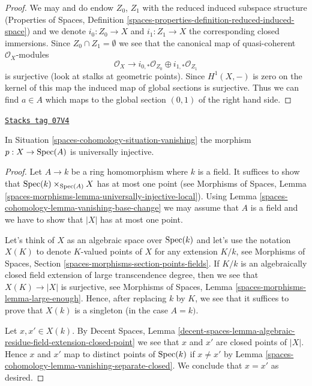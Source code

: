 \begin{proof}
We may and do endow $Z_0$, $Z_1$ with the reduced induced subspace structure
(Properties of Spaces, Definition
\ref{spaces-properties-definition-reduced-induced-space}) and we denote
$i_0 : Z_0 \to X$ and $i_1 : Z_1 \to X$ the corresponding closed immersions.
Since $Z_0 \cap Z_1 = \emptyset$ we see that the canonical map of
quasi-coherent $\mathcal{O}_X$-modules
$$
\mathcal{O}_X
\longrightarrow
i_{0, *}\mathcal{O}_{Z_0} \oplus i_{1, *}\mathcal{O}_{Z_1}
$$
is surjective (look at stalks at geometric points). Since $H^1(X, -)$ is
zero on the kernel of this map the induced map of global sections is
surjective. Thus we can find $a \in A$ which maps to the global section
$(0, 1)$ of the right hand side.
\end{proof}

\begin{lemma}
\label{spaces-cohomology-lemma-vanishing-injective}
\href{https://stacks.math.columbia.edu/tag/07V4}{\texttt{Stacks tag 07V4}}

In Situation \ref{spaces-cohomology-situation-vanishing} the morphism $p : X \to \operatorname{Spec}(A)$ is
universally injective.
\end{lemma}

\begin{proof}
Let $A \to k$ be a ring homomorphism where $k$ is a field. It suffices to
show that $\operatorname{Spec}(k) \times_{\operatorname{Spec}(A)} X$ has at most one point (see
Morphisms of Spaces, Lemma
\ref{spaces-morphisms-lemma-universally-injective-local}).
Using Lemma \ref{spaces-cohomology-lemma-vanishing-base-change} we may assume that $A$
is a field and we have to show that $|X|$ has at most one point.

\medskip\noindent
Let's think of $X$ as an algebraic space over $\operatorname{Spec}(k)$ and let's
use the notation $X(K)$ to denote $K$-valued points of $X$
for any extension $K/k$, see
Morphisms of Spaces, Section \ref{spaces-morphisms-section-points-fields}.
If $K/k$ is an algebraically closed field extension
of large transcendence degree, then we see that $X(K) \to |X|$
is surjective, see Morphisms of Spaces, Lemma
\ref{spaces-morphisms-lemma-large-enough}. Hence, after replacing $k$
by $K$, we see that it suffices to prove that $X(k)$ is a singleton
(in the case $A = k)$.

\medskip\noindent
Let $x, x' \in X(k)$. By Decent Spaces, Lemma
\ref{decent-spaces-lemma-algebraic-residue-field-extension-closed-point}
we see that $x$ and $x'$ are closed points of $|X|$. Hence $x$ and $x'$
map to distinct points of $\operatorname{Spec}(k)$ if $x \not = x'$ by
Lemma \ref{spaces-cohomology-lemma-vanishing-separate-closed}. We conclude that
$x = x'$ as desired.
\end{proof}

